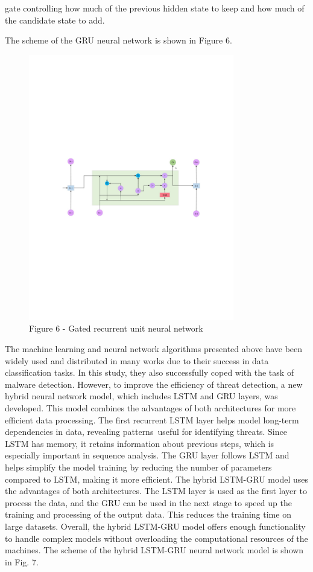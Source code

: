 gate controlling how much of the previous hidden state to keep and how
much of the candidate state to add.

The scheme of the GRU neural network is shown in Figure 6.

\begin{figure}[H]
	\centering
	\includegraphics[width=0.8\textwidth]{media/ict/image79}
	\caption*{Figure 6 - Gated recurrent unit neural network}
\end{figure}

The machine learning and neural network algorithms presented above have
been widely used and distributed in many works due to their success in
data classification tasks. In this study, they also successfully coped
with the task of malware detection. However, to improve the efficiency
of threat detection, a new hybrid neural network model, which includes
LSTM and GRU layers, was developed. This model combines the advantages
of both architectures for more efficient data processing. The first
recurrent LSTM layer helps model long-term dependencies in data,
revealing patterns~useful for identifying threats. Since LSTM has
memory, it retains information about previous steps, which is especially
important in sequence analysis. The GRU layer follows LSTM and helps
simplify the model training by reducing the number of parameters
compared to LSTM, making it more efficient. The hybrid LSTM-GRU model
uses the advantages of both architectures. The LSTM layer is used as the
first layer to process the data, and the GRU can be used in the next
stage to speed up the training and processing of the output data. This
reduces the training time on large datasets. Overall, the hybrid
LSTM-GRU model offers enough functionality to handle complex models
without overloading the computational resources of the machines. The
scheme of the hybrid LSTM-GRU neural network model is shown in Fig. 7.


